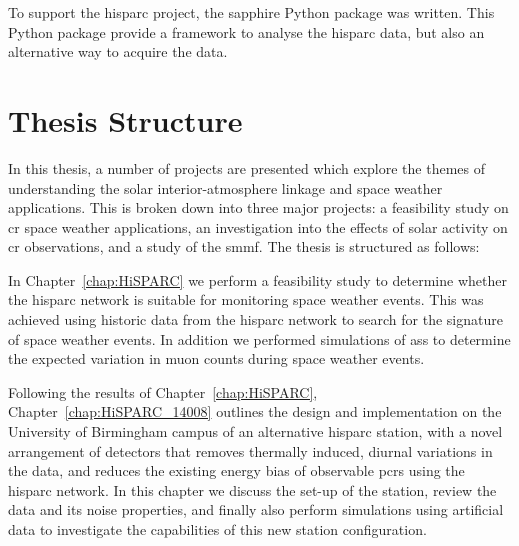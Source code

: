 To support the \gls{hisparc} project, the \gls{sapphire} Python package \citep{fokkema_hisparc_2012,fokkema_sapphire_2012} was written. This Python package provide a framework to analyse the \gls{hisparc} data, but also an alternative way to acquire the data.







\glsresetall 
{}
\section{Thesis Structure}

In this thesis, a number of projects are presented which explore the themes of understanding the solar interior-atmosphere linkage and space weather applications. This is broken down into three major projects: a feasibility study on \gls{cr} space weather applications, an investigation into the effects of solar activity on \gls{cr} observations, and a study of the \gls{smmf}. The thesis is structured as follows:

In Chapter~\ref{chap:HiSPARC} we perform a feasibility study to determine whether the \gls{hisparc} network is suitable for monitoring space weather events. This was achieved using historic data from the \gls{hisparc} network to search for the signature of space weather events. In addition we performed simulations of \glspl{as} to determine the expected variation in muon counts during space weather events. %

Following the results of Chapter~\ref{chap:HiSPARC}, Chapter~\ref{chap:HiSPARC_14008} outlines the design and implementation on the University of Birmingham campus of an alternative \gls{hisparc} station, with a novel arrangement of detectors that removes thermally induced, diurnal variations in the data, and reduces the existing energy bias of observable \glspl{pcr} using the \gls{hisparc} network. In this chapter we discuss the set-up of the station, review the data and its noise properties, and finally also perform simulations using artificial data to investigate the capabilities of this new station configuration. %

